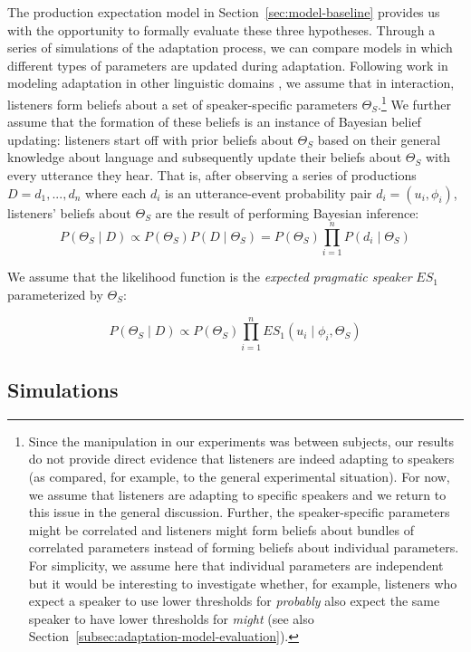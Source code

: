 \documentclass[man, floatsintext]{apa6}
\newcommand{\sectionref}[1]{Section~\ref{#1}}
\begin{document}
The production expectation model in \sectionref{sec:model-baseline} provides us with the opportunity to formally evaluate these three hypotheses.
Through a series of simulations of the adaptation process, we can compare models in which different types of parameters are
 updated during adaptation. Following work in modeling adaptation in other linguistic domains \parencite[e.g.,][]{Kleinschmidt2012,Kleinschmidt2015,Qing2014,Hawkins2017,Roettger2019}, 
we assume that in interaction, listeners form beliefs about a set of speaker-specific parameters $\Theta_S$.\footnote{Since the manipulation in our experiments was between subjects, our results do not provide direct evidence that listeners are indeed adapting to speakers (as compared, for example, to the general experimental situation). For now, we assume that listeners are adapting to specific speakers and we return to this issue in the general discussion.
Further, the speaker-specific parameters might be correlated and  listeners might form beliefs about bundles of correlated parameters instead of forming beliefs about individual parameters. For simplicity, we assume here that individual parameters are independent but it would be interesting to investigate whether, for example, listeners who expect a speaker to use lower thresholds for \textit{probably} also expect the same speaker to have lower thresholds for \textit{might} (see also Section~\ref{subsec:adaptation-model-evaluation}).}
We further assume that the formation of these beliefs is an instance of Bayesian belief updating:
listeners start off with prior beliefs about $\Theta_S$ based on their general knowledge about 
language and subsequently update their beliefs about $\Theta_S$ with every utterance they hear. 
That is, after observing a series of productions $D={d_1, ..., d_n}$ where each $d_i$ is an 
utterance-event probability pair $d_i = (u_i, \phi_i)$, listeners' beliefs about $\Theta_S$ are the result
of performing Bayesian inference:
$$P(\Theta_S \mid D) \propto P(\Theta_S) P(D \mid \Theta_S) = P(\Theta_S) \prod_{i=1}^nP(d_i \mid \Theta_S) $$

\noindent We assume that the likelihood function is the \textit{expected pragmatic speaker} $ES_1$ parameterized by $\Theta_S$:

$$P(\Theta_S \mid D) \propto P(\Theta_S)  \prod_{i=1}^n ES_1(u_i \mid \phi_i, \Theta_S) $$



\subsection{Simulations}
\end{document}
